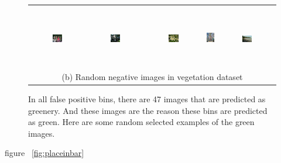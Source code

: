 \begin{figure}[th]
{{\begin{center}
\begin{tabular}{@{}c@{\,\,\,}c@{\,\,\,}c@{\,\,\,}c@{\,\,\,}c@{\,\,\,}}
\\[-6pt]
\hline
\\[-6pt]
\includegraphics[width=0.19\textwidth]{imggrid/falseposi/16.jpg} &
\includegraphics[width=0.19\textwidth]{imggrid/falseposi/17.jpg} &
\includegraphics[width=0.19\textwidth]{imggrid/falseposi/18.jpg} &
\includegraphics[height=1in]{imggrid/falseposi/19.jpg} &
\includegraphics[width=0.19\textwidth]{imggrid/falseposi/20.jpg} \\
\multicolumn{5}{c}{(b) Random negative images in vegetation dataset} \\
\end{tabular}
\end{center}
}}
\caption{In all false positive bins, there are 47 images that are predicted as greenery. And these images are the reason these bins are predicted as green. Here are some random selected examples of the green images.}
\label{fig:falseposi}
\end{figure}



figure ~\ref{fig:placeinbar} 

